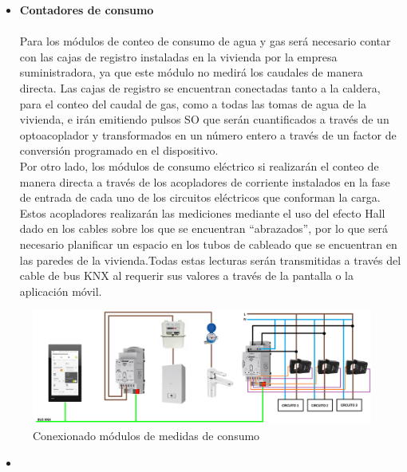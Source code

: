 \begin{itemize}
\item \textbf{Contadores de consumo} \\ \\
Para los módulos de conteo de consumo de agua y gas será necesario contar con las cajas de registro instaladas en la vivienda por la empresa suministradora, ya que este módulo no medirá los caudales de manera directa. Las cajas de registro se encuentran conectadas tanto a la caldera, para el conteo del caudal de gas, como a todas las tomas de agua de la vivienda, e irán emitiendo pulsos SO que serán cuantificados a través de un optoacoplador y transformados en un número entero a través de un factor de conversión programado en el dispositivo. \\
Por otro lado, los módulos de consumo eléctrico si realizarán el conteo de manera directa a través de los acopladores de corriente instalados en la fase de entrada de cada uno de los circuitos eléctricos que conforman la carga. Estos acopladores realizarán las mediciones mediante el uso del efecto Hall dado en los cables sobre los que se encuentran “abrazados”, por lo que será necesario planificar un espacio en los tubos de cableado que se encuentran en las paredes de la vivienda.Todas estas lecturas serán transmitidas a través del cable de bus KNX al requerir sus valores a través de la pantalla o la aplicación móvil.
\end{itemize}
\begin{flushleft}
\begin{figure}[H]
\includegraphics[width=1.15\textwidth]{figures/conex_consumo.png}   
\caption{Conexionado módulos de medidas de consumo}
\label{fig:conex_consumo}
\end{figure}
\end{flushleft}

\begin{itemize}
\item \textbf{} \\ \\
\end{itemize} 